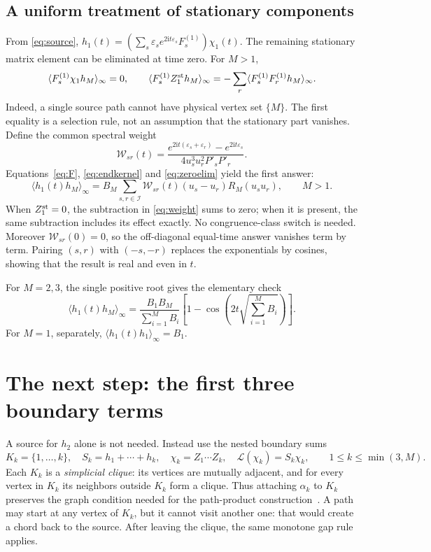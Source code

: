 \documentclass[11pt,a4paper]{article}
\newcommand{\ii}{\mathrm i}
\newcommand{\av}[1]{\langle #1\rangle_\infty}
\newcommand{\LL}{\mathcal L}
\newcommand{\eps}{\varepsilon}
\newcommand{\Sig}{\mathcal I}
\newcommand{\W}{\mathcal W}
\begin{document}
\subsection{A uniform treatment of stationary components}
From \eqref{eq:source}, $h_1(t)=(\sum_s\eps_se^{2\ii t\eps_s}F_s^{(1)})\chi_1(t)$. The remaining stationary matrix element can be eliminated at time zero. For $M>1$,
\begin{equation}
 \av{F_s^{(1)}\chi_1h_M}=0,
 \qquad
 \av{F_s^{(1)}Z_1^{\rm st}h_M}
 =-\sum_r\av{F_s^{(1)}F_r^{(1)}h_M}.
 \label{eq:zeroelim}
\end{equation}
Indeed, a single source path cannot have physical vertex set $\{M\}$.
The first equality is a selection rule, not an assumption that the stationary part vanishes.
Define the common spectral weight
\begin{equation}
 \W_{sr}(t)=
 \frac{e^{2\ii t(\eps_s+\eps_r)}-e^{2\ii t\eps_s}}
 {4u_s^3u_r^2P'_sP'_r}.
 \label{eq:weight}
\end{equation}
Equations~\eqref{eq:F}, \eqref{eq:endkernel} and \eqref{eq:zeroelim} yield the first answer:
\begin{equation}
 \boxed{\av{h_1(t)h_M}
 =B_M\sum_{s,r\in\Sig}\W_{sr}(t)(u_s-u_r)R_M(u_su_r),\qquad M>1.}
 \label{eq:endcorr}
\end{equation}
When $Z_1^{\rm st}=0$, the subtraction in \eqref{eq:weight} sums to zero; when it is present, the same subtraction includes its effect exactly. No congruence-class switch is needed. Moreover $\W_{sr}(0)=0$, so the off-diagonal equal-time answer vanishes term by term. Pairing $(s,r)$ with $(-s,-r)$ replaces the exponentials by cosines, showing that the result is real and even in $t$.

For $M=2,3$, the single positive root gives the elementary check
\begin{equation}
 \av{h_1(t)h_M}
 =\frac{B_1B_M}{\sum_{i=1}^{M}B_i}
 \left[1-\cos\!\left(2t\sqrt{\sum_{i=1}^{M}B_i}\right)\right].
 \label{eq:small}
\end{equation}
For $M=1$, separately, $\av{h_1(t)h_1}=B_1$.

\section{The next step: the first three boundary terms}
A source for $h_2$ alone is not needed. Instead use the nested boundary sums
\begin{equation}
 K_k=\{1,\ldots,k\},\quad
 S_k=h_1+\cdots+h_k,\quad
 \chi_k=Z_1\cdots Z_k,\quad
 \LL(\chi_k)=S_k\chi_k,
 \qquad 1\le k\le\min(3,M).
 \label{eq:cliquesource}
\end{equation}
Each $K_k$ is a \emph{simplicial clique}: its vertices are mutually adjacent, and for every vertex in $K_k$ its neighbors outside $K_k$ form a clique. Thus attaching $\alpha_k$ to $K_k$ preserves the graph condition needed for the path-product construction~\cite{Elman,Chapman,FPV}. A path may start at any vertex of $K_k$, but it cannot visit another one: that would create a chord back to the source. After leaving the clique, the same monotone gap rule applies.
\end{document}
